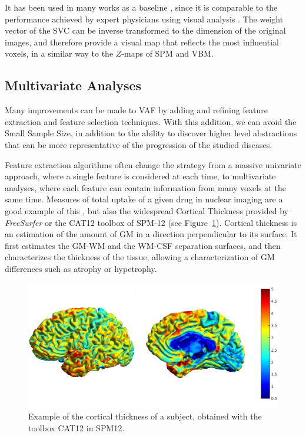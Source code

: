 It has been used in many works as a baseline \cite{Spetsieris2009,Salas-Gonzalez2009,Martinez-Murcia2016}, since it is comparable to the performance achieved by expert physicians using visual analysis \cite{Stoeckel04}. The weight vector of the \ac{SVC} can be inverse transformed to the dimension of the original images, and therefore provide a visual map that reflects the most influential voxels, in a similar way to the $Z$-maps of \ac{SPM} and \ac{VBM}. 

\subsection{Multivariate Analyses}\label{sec:mvanalyses}
Many improvements can be made to \ac{VAF} by adding and refining feature extraction and feature selection techniques. With this addition, we can avoid the Small Sample Size, in addition to the ability to discover higher level abstractions that can be more representative of the progression of the studied diseases. 

Feature extraction algorithms often change the strategy from a massive univariate approach, where a single feature is considered at each time, to multivariate analyses, where each feature can contain information from many voxels at the same time. Measures of total uptake of a given drug in nuclear imaging are a good example of this \cite{Zhou2007,Lozano2007}, but also the widespread Cortical Thickness \cite{Dale1999} provided by \textit{FreeSurfer} or the CAT12 toolbox of \ac{SPM}-12 (see Figure~\ref{fig:corticalthickness}). Cortical thickness is an estimation of the amount of \ac{GM} in a direction perpendicular to its surface. It first estimates the \ac{GM}-\ac{WM} and the \ac{WM}-\ac{CSF} separation surfaces, and then characterizes the thickness of the tissue, allowing a characterization of \ac{GM} differences such as atrophy or hypetrophy. 

\begin{figure}
\centering
\includegraphics[width=0.8\linewidth]{Graphics/ch2/corticalThickness}
\caption[Example of the cortical thickness of a subject.]{Example of the cortical thickness of a subject, obtained with the toolbox CAT12 in SPM12.}
\label{fig:corticalthickness}
\end{figure}

